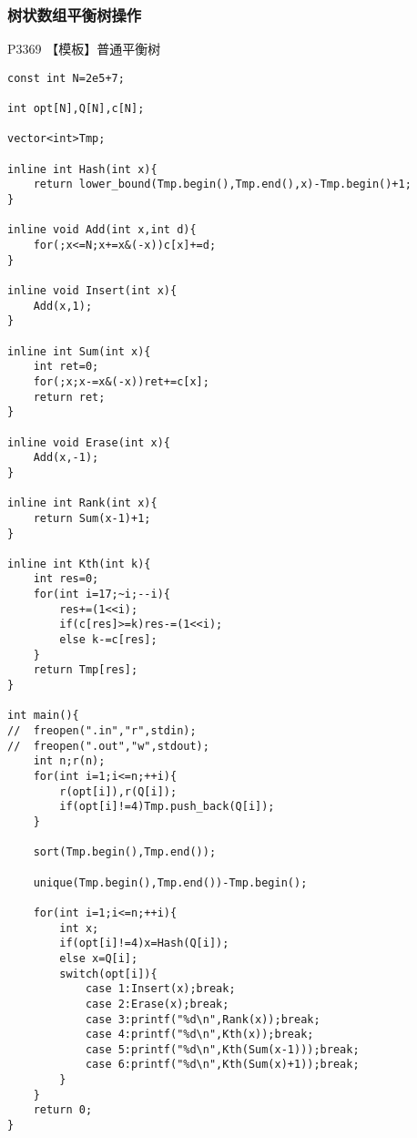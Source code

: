 \documentclass{ctexart}
\begin{document}
\subsubsection{树状数组平衡树操作}
P3369 【模板】普通平衡树
\begin{lstlisting}
const int N=2e5+7;

int opt[N],Q[N],c[N];

vector<int>Tmp;

inline int Hash(int x){
    return lower_bound(Tmp.begin(),Tmp.end(),x)-Tmp.begin()+1;
}

inline void Add(int x,int d){
    for(;x<=N;x+=x&(-x))c[x]+=d;
}

inline void Insert(int x){
    Add(x,1);
}

inline int Sum(int x){
    int ret=0;
    for(;x;x-=x&(-x))ret+=c[x];
    return ret;
}

inline void Erase(int x){
    Add(x,-1);
}

inline int Rank(int x){
    return Sum(x-1)+1;
}

inline int Kth(int k){
    int res=0;
    for(int i=17;~i;--i){
        res+=(1<<i);
        if(c[res]>=k)res-=(1<<i);
        else k-=c[res];
    }
    return Tmp[res];
}

int main(){
//	freopen(".in","r",stdin);
//	freopen(".out","w",stdout);
    int n;r(n);
    for(int i=1;i<=n;++i){
        r(opt[i]),r(Q[i]);
        if(opt[i]!=4)Tmp.push_back(Q[i]);
    }
    
    sort(Tmp.begin(),Tmp.end());
    
    unique(Tmp.begin(),Tmp.end())-Tmp.begin();
    
    for(int i=1;i<=n;++i){
        int x;
        if(opt[i]!=4)x=Hash(Q[i]);
        else x=Q[i];
        switch(opt[i]){
            case 1:Insert(x);break;
            case 2:Erase(x);break;
            case 3:printf("%d\n",Rank(x));break;
            case 4:printf("%d\n",Kth(x));break;
            case 5:printf("%d\n",Kth(Sum(x-1)));break;
            case 6:printf("%d\n",Kth(Sum(x)+1));break;
        }
    }
    return 0;
}
\end{lstlisting}
\end{document}
